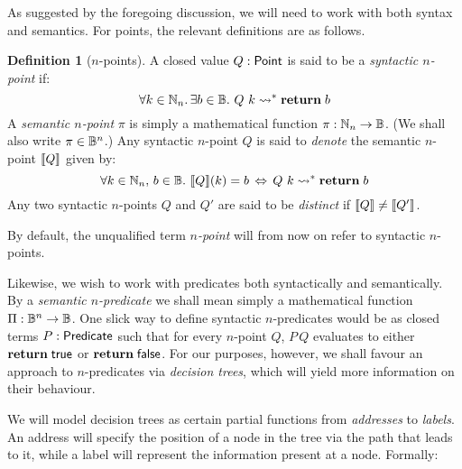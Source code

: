 \documentclass[12pt,phd,lfcs,twoside,openright,logo,leftchapter,normalheadings]{infthesis}
\theoremstyle{plain}
\theoremstyle{definition}
\newtheorem{definition}[theorem]{Definition}
\begin{document}
As suggested by the foregoing discussion, we will need to work with
both syntax and semantics.  For points, the relevant definitions are
as follows.

\begin{definition}[$n$-points]\label{def:semantic-n-point}
  A closed value $Q : \mathsf{Point}$ is said to be a \emph{syntactic $n$-point} if:
{
  \[
    \forall k \in \mathbb{N}_n.\,\exists b \in \mathbb{B}.~ Q~k \leadsto^\ast \mathbf{return}\;b
  \]}%
A \emph{semantic $n$-point} $\pi$ is simply a mathematical function
$\pi: \mathbb{N}_n \to \mathbb{B}$.  (We shall also write $\pi \in \mathbb{B}^n$.)  Any
syntactic $n$-point $Q$ is said to \emph{denote} the semantic
$n$-point $\val{Q}$ given by:
{
  \[
  \forall k \in \mathbb{N}_n,\, b \in \mathbb{B}.~ \llbracket Q \rrbracket (k) = b \,\Leftrightarrow\, Q~k \leadsto^\ast \mathbf{return}\;b
  \]}%
%
Any two syntactic $n$-points $Q$ and $Q'$ are said to be
\emph{distinct} if $\val{Q} \neq \val{Q'}$.
%
\end{definition}

By default, the unqualified term \emph{$n$-point} will from now on
refer to syntactic $n$-points.

Likewise, we wish to work with predicates both syntactically and
semantically.  By a \emph{semantic $n$-predicate} we shall mean simply
a mathematical function $\Pi: \mathbb{B}^n \to \mathbb{B}$.  One slick way to define
syntactic $n$-predicates would be as closed terms $P:\mathsf{Predicate}$ such
that for every $n$-point $Q$, $P\,Q$ evaluates to either
$\mathbf{return}\;\mathsf{true}$ or $\mathbf{return}\;\mathsf{false}$.  For our purposes, however, we
shall favour an approach to $n$-predicates via \emph{decision trees},
which will yield more information on their behaviour.

We will model decision trees as certain partial functions from
\emph{addresses} to \emph{labels}.  An address will specify the
position of a node in the tree via the path that leads to it, while a
label will represent the information present at a node. Formally:
\end{document}

